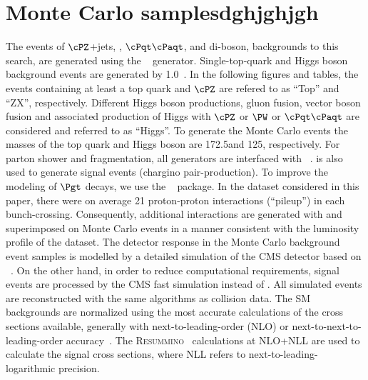 \section{Monte Carlo samplesdghjghjgh}
\label{sect:MCSamples}
The events of $\cPZ$+jets, \wjets, $\cPqt\cPaqt$, and di-boson, backgrounds to this search, are generated using the ~\cite{Alwall:2011uj} generator. 
Single-top-quark and Higgs boson background events are generated by {\POWHEG} 1.0~\cite{Nason:2004rx,Frixione:2007vw,Alioli:2009je,Alioli:2010xd}.
In the following figures and tables, the events containing at least a top quark and $\cPZ$ are refered to as ``Top'' and ``ZX'', respectively. 
Different Higgs boson productions, gluon fusion, vector boson fusion and associated production of Higgs with $\cPZ$ or $\PW$ or $\cPqt\cPaqt$ are considered and referred to as ``Higgs''. To generate the Monte Carlo events the masses of the top quark and Higgs boson are 172.5\GeV and 125\GeV, respectively.
For parton shower and fragmentation, all generators are interfaced with ~\cite{Sjostrand:2006za}.
\PYTHIA is also used to generate signal events (chargino pair-production). To improve the modeling of $\Pgt$ decays, we use the  \TAUOLA~\cite{Davidson:2010rw} package.
In the dataset considered in this paper,
there were on average 21 proton-proton interactions (``pileup'') in each bunch-crossing.
Consequently, additional interactions are generated with \PYTHIA and superimposed on Monte Carlo events in a manner consistent with the
luminosity profile of the dataset.
The detector response in the Monte Carlo background event samples is modelled by a
detailed simulation
of the CMS detector based on {\GEANTfour}~\cite{Agostinelli:2002hh}.  
On the other hand, in order to reduce  computational requirements, signal events 
are processed by the CMS fast simulation \cite{Abdullin:2011zz} instead of {\GEANTfour}. 
All simulated events are reconstructed with the same algorithms as collision data.
The SM backgrounds are normalized using the most accurate calculations of the cross sections available,
generally with next-to-leading-order (NLO) or next-to-next-to-leading-order accuracy~\cite{Campbell:2012uf,Campbell:2011bn,xsec_WZ,Czakon:2013goa}.
The \textsc{Resummino}~\cite{Fuks:2012qx,Fuks:2013vua,Fuks:2013lya} calculations at NLO+NLL are used to calculate the signal cross sections, where 
NLL refers to next-to-leading-logarithmic precision.

